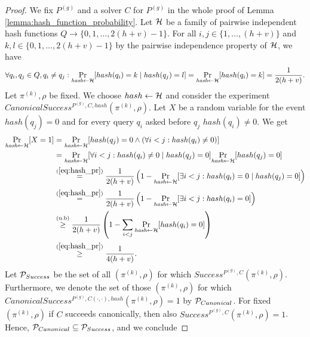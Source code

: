 \begin{proof}
We fix $P^{(g)}$ and a solver $C$ for $P^{(g)}$ in the whole proof of Lemma \ref{lemma:hash_function_probability}.
Let $\mathcal{H}$ be a family of pairwise independent hash functions $Q \rightarrow \{0,1, \dots,2(h+v)-1\}$.
For all $i,j \in \{1, \dots, (h+v)\}$ and $k,l \in \{0,1,\dots,2(h+v)-1\}$ by the pairwise independence property of $\mathcal{H}$,
we have
\begin{align}
  \label{eq:hash_pr}
 \forall q_i,q_j \in Q, q_i \neq q_j : \underset{\textit{hash} \leftarrow \mathcal{H}}{\Pr}[hash(q_i) = k \mid hash(q_j) = l] = \underset{\textit{hash} \leftarrow \mathcal{H}}{\Pr}[hash(q_i) = k] = \frac{1}{2(h+v)}.
\end{align}
Let $\pi^{(k)}, \rho$ be fixed. We choose $hash \leftarrow \mathcal{H}$ and consider the experiment $CanonicalSuccess^{P^{(g)}, C, hash}(\pi^{(k)}, \rho)$.
Let $X$ be a random variable for the event $hash(q_j) = 0$ and for every query $q_i$ asked before $q_j$  $hash(q_i) \neq 0$.
We get
\begin{align*}
  \underset{\textit{hash} \leftarrow \mathcal{H}}{\Pr}[X=1]
  &= \underset{\textit{hash} \leftarrow \mathcal{H}}{\Pr}[hash(q_j) = 0 \land (\forall i < j : hash(q_i) \neq 0)] \\
  &= \underset{\textit{hash} \leftarrow \mathcal{H}}{\Pr}[\forall i < j : hash(q_i) \neq 0 \mid hash(q_j) = 0] \underset{\textit{hash} \leftarrow \mathcal{H}}{\Pr}[hash(q_j) = 0] \\
  &\stackrel{(\ref{eq:hash_pr})}{=} \frac{1}{2(h+v)}\left(1 -\underset{\textit{hash} \leftarrow \mathcal{H}}{\Pr}[\exists i < j : hash(q_i) = 0 \mid hash(q_j) = 0] \right) \\
  &\stackrel{(\ref{eq:hash_pr})}{=} \frac{1}{2(h+v)} \left( 1 -\underset{\textit{hash} \leftarrow \mathcal{H}}{\Pr}[\exists i < j : hash(q_i) = 0] \right) \\
  &\stackrel{(\text{u.b})}{\geq} \frac{1}{2(h+v)} \left( 1 - \sum_{i < j} \underset{\textit{hash} \leftarrow \mathcal{H}}{\Pr}[hash(q_i) = 0] \right) \\
  &\stackrel{(\ref{eq:hash_pr})}{\geq} \frac{1}{4(h+v)}.
\end{align*}
Let $\mathcal{P}_{Success}$ be the set of all $(\pi^{(k)},\rho)$ for which $Success^{P^{(g)}, C}(\pi^{(k)}, \rho)$. Furthermore,
we denote the set of those $(\pi^{(k)},\rho)$ for which $CanonicalSuccess^{P^{(g)}, C(\cdot, \cdot), hash}(\pi^{(k)}, \rho) = 1$ by $\mathcal{P}_{Canonical}$.
For fixed $(\pi^{(k)}, \rho)$ if $C$ succeeds canonically, then also $Success^{P^{(g)}, C}(\pi^{(k)}, \rho) = 1$.
Hence, $\mathcal{P}_{Canonical} \subseteq \mathcal{P}_{Success}$, and we conclude

\end{proof}
